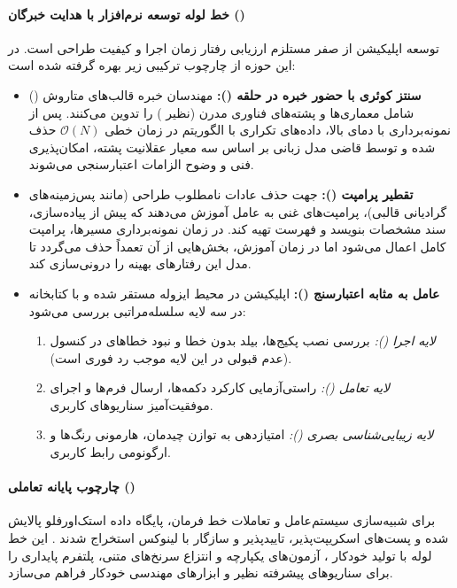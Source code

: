 \paragraph*{خط لوله توسعه نرم‌افزار با هدایت خبرگان ()}
توسعه اپلیکیشن از صفر مستلزم ارزیابی رفتار زمان اجرا و کیفیت طراحی است. در این حوزه از چارچوب ترکیبی زیر بهره گرفته شده است:
\begin{itemize}
    \item \textbf{سنتز کوئری با حضور خبره در حلقه ():} مهندسان خبره قالب‌های متاروش () شامل معماری‌ها و پشته‌های فناوری مدرن (نظیر ) را تدوین می‌کنند. پس از نمونه‌برداری با دمای بالا، داده‌های تکراری با الگوریتم  در زمان خطی $\mathcal{O}(N)$ حذف شده و توسط قاضی مدل زبانی بر اساس سه معیار عقلانیت پشته، امکان‌پذیری فنی و وضوح الزامات اعتبارسنجی می‌شوند.
    \item \textbf{تقطیر پرامپت ():} جهت حذف عادات نامطلوب طراحی (مانند پس‌زمینه‌های گرادیانی قالبی)، پرامپت‌های غنی به عامل آموزش می‌دهند که پیش از پیاده‌سازی، سند مشخصات بنویسد و فهرست  تهیه کند. در زمان نمونه‌برداری مسیرها، پرامپت کامل اعمال می‌شود اما در زمان آموزش، بخش‌هایی از آن تعمداً حذف می‌گردد تا مدل این رفتارهای بهینه را درونی‌سازی کند.
    \item \textbf{عامل به مثابه اعتبارسنج ():} اپلیکیشن در محیط ایزوله مستقر شده و با کتابخانه  در سه لایه سلسله‌مراتبی بررسی می‌شود:
    \begin{enumerate}
        \item \textit{لایه اجرا ():} بررسی نصب پکیج‌ها، بیلد بدون خطا و نبود خطاهای  در کنسول (عدم قبولی در این لایه موجب رد فوری است).
        \item \textit{لایه تعامل ():} راستی‌آزمایی کارکرد دکمه‌ها، ارسال فرم‌ها و اجرای موفقیت‌آمیز سناریوهای کاربری.
        \item \textit{لایه زیبایی‌شناسی بصری ():} امتیازدهی به توازن چیدمان، هارمونی رنگ‌ها و ارگونومی رابط کاربری.
    \end{enumerate}
\end{itemize}

\paragraph*{چارچوب پایانه تعاملی ()}
برای شبیه‌سازی سیستم‌عامل و تعاملات خط فرمان، پایگاه داده استک‌اورفلو پالایش شده و پست‌های اسکریپت‌پذیر، تاییدپذیر و سازگار با لینوکس استخراج شدند \cite{merrill2026terminal}. این خط لوله با تولید خودکار ، آزمون‌های یکپارچه و انتزاع سرنخ‌های متنی، پلتفرم پایداری را برای سناریوهای پیشرفته نظیر  \cite{luo2026cve} و ابزارهای مهندسی خودکار فراهم می‌سازد.


